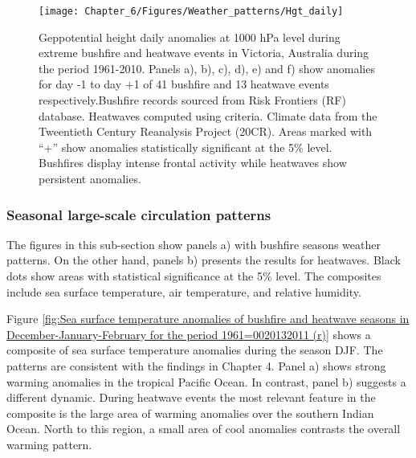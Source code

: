 \begin{figure}[h]
\noindent \begin{centering}
\texttt{[image: Chapter\_6/Figures/Weather\_patterns/Hgt\_daily]}
\par\end{centering}

\caption[Geppotential height daily anomalies at 1000 hPa level during extreme
bushfire and heatwave events in Victoria, Australia during the period
1961-2010]{Geppotential height daily anomalies at 1000 hPa level during extreme
bushfire and heatwave events in Victoria, Australia during the period
1961-2010. Panels a), b), c), d), e) and f) show anomalies for day
-1 to day +1 of 41 bushfire and 13 heatwave events respectively.Bushfire
records sourced from Risk Frontiers (RF) database. Heatwaves computed
using \citet{Pezza2012} criteria. Climate data from the Tweentieth
Century Reanalysis Project (20CR). Areas marked with ``+'' show
anomalies statistically significant at the 5\% level. Bushfires display
intense frontal activity while heatwaves show persistent anomalies.\label{fig: Geopotential height anomalies at 500 hPa level for day -1 to day +1 respectively of 27 bushfire events (period 1961=0020132011) (r)}}
\end{figure}



\subsubsection{Seasonal large-scale circulation patterns }

The figures in this sub-section show panels a) with bushfire seasons
weather patterns. On the other hand, panels b) presents the results
for heatwaves. Black dots show areas with statistical significance
at the 5\% level. The composites include sea surface temperature,
air temperature, and relative humidity.

Figure \ref{fig:Sea surface temperature anomalies of bushfire and heatwave seasons in December-January-February for the period 1961=0020132011 (r)}
shows a composite of sea surface temperature anomalies during the
season DJF. The patterns are consistent with the findings in Chapter
4. Panel a) shows strong warming anomalies in the tropical Pacific
Ocean. In contrast, panel b) suggests a different dynamic. During
heatwave events the most relevant feature in the composite is the
large area of warming anomalies over the southern Indian Ocean. North
to this region, a small area of cool anomalies contrasts the overall
warming pattern. 

